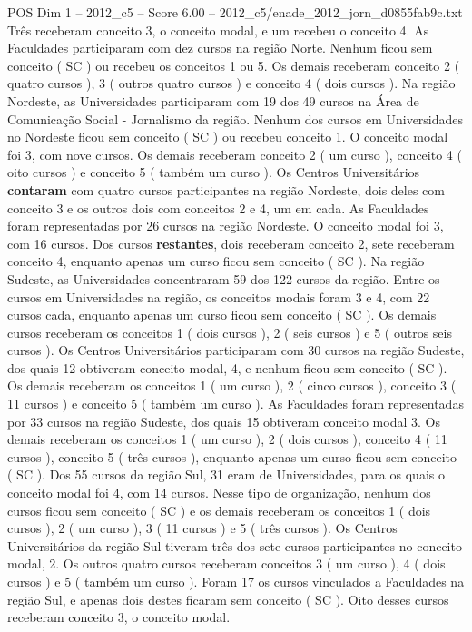 \begin{textsample}{POS Dim 1 – 2012\_c5 – Score 6.00 – 2012\_c5/enade\_2012\_jorn\_d0855fab9c.txt}
Três receberam conceito 3, o conceito modal, e um recebeu o conceito 4.
As Faculdades participaram com dez cursos na região Norte.
Nenhum ficou sem conceito ( SC ) ou recebeu os conceitos 1 ou 5.
Os demais receberam conceito 2 ( quatro cursos ), 3 ( outros quatro cursos ) e conceito 4 ( dois cursos ).
Na região Nordeste, as Universidades participaram com 19 dos 49 cursos na Área de Comunicação Social - Jornalismo da região.
Nenhum dos cursos em Universidades no Nordeste ficou sem conceito ( SC ) ou recebeu conceito 1.
O conceito modal foi 3, com nove cursos.
Os demais receberam conceito 2 ( um curso ), conceito 4 ( oito cursos ) e conceito 5 ( também um curso ).
Os Centros Universitários \textbf{contaram} com quatro cursos participantes na região Nordeste, dois deles com conceito 3 e os outros dois com conceitos 2 e 4, um em cada.
As Faculdades foram representadas por 26 cursos na região Nordeste.
O conceito modal foi 3, com 16 cursos.
Dos cursos \textbf{restantes}, dois receberam conceito 2, sete receberam conceito 4, enquanto apenas um curso ficou sem conceito ( SC ).
Na região Sudeste, as Universidades concentraram 59 dos 122 cursos da região.
Entre os cursos em Universidades na região, os conceitos modais foram 3 e 4, com 22 cursos cada, enquanto apenas um curso ficou sem conceito ( SC ).
Os demais cursos receberam os conceitos 1 ( dois cursos ), 2 ( seis cursos ) e 5 ( outros seis cursos ).
Os Centros Universitários participaram com 30 cursos na região Sudeste, dos quais 12 obtiveram conceito modal, 4, e nenhum ficou sem conceito ( SC ).
Os demais receberam os conceitos 1 ( um curso ), 2 ( cinco cursos ), conceito 3 ( 11 cursos ) e conceito 5 ( também um curso ).
As Faculdades foram representadas por 33 cursos na região Sudeste, dos quais 15 obtiveram conceito modal 3.
Os demais receberam os conceitos 1 ( um curso ), 2 ( dois cursos ), conceito 4 ( 11 cursos ), conceito 5 ( três cursos ), enquanto apenas um curso ficou sem conceito ( SC ).
Dos 55 cursos da região Sul, 31 eram de Universidades, para os quais o conceito modal foi 4, com 14 cursos.
Nesse tipo de organização, nenhum dos cursos ficou sem conceito ( SC ) e os demais receberam os conceitos 1 ( dois cursos ), 2 ( um curso ), 3 ( 11 cursos ) e 5 ( três cursos ).
Os Centros Universitários da região Sul tiveram três dos sete cursos participantes no conceito modal, 2.
Os outros quatro cursos receberam conceitos 3 ( um curso ), 4 ( dois cursos ) e 5 ( também um curso ).
Foram 17 os cursos vinculados a Faculdades na região Sul, e apenas dois destes ficaram sem conceito ( SC ).
Oito desses cursos receberam conceito 3, o conceito modal.

\end{textsample}
